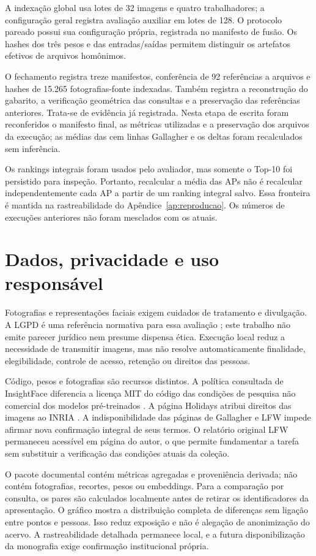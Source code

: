 A indexação global usa lotes de 32 imagens e quatro trabalhadores; a configuração geral registra avaliação auxiliar em lotes de 128. O protocolo pareado possui sua configuração própria, registrada no manifesto de fusão. Os hashes dos três pesos e das entradas/saídas permitem distinguir os artefatos efetivos de arquivos homônimos.

O fechamento registra treze manifestos, conferência de 92 referências a arquivos e hashes de 15.265 fotografias-fonte indexadas. Também registra a reconstrução do gabarito, a verificação geométrica das consultas e a preservação das referências anteriores. Trata-se de evidência já registrada. Nesta etapa de escrita foram reconferidos o manifesto final, as métricas utilizadas e a preservação dos arquivos da execução; as médias das cem linhas Gallagher e os deltas foram recalculados sem inferência.

Os rankings integrais foram usados pelo avaliador, mas somente o Top-10 foi persistido para inspeção. Portanto, recalcular a média das APs não é recalcular independentemente cada AP a partir de um ranking integral salvo. Essa fronteira é mantida na rastreabilidade do Apêndice~\ref{ap:reproducao}. Os números de execuções anteriores não foram mesclados com os atuais.

\section{Dados, privacidade e uso responsável}
Fotografias e representações faciais exigem cuidados de tratamento e divulgação. A LGPD é uma referência normativa para essa avaliação \cite{Brasil2018}; este trabalho não emite parecer jurídico nem presume dispensa ética. Execução local reduz a necessidade de transmitir imagens, mas não resolve automaticamente finalidade, elegibilidade, controle de acesso, retenção ou direitos das pessoas.

Código, pesos e fotografias são recursos distintos. A política consultada de InsightFace diferencia a licença MIT do código das condições de pesquisa não comercial dos modelos pré-treinados \cite{InsightFace}. A página Holidays atribui direitos das imagens ao INRIA \cite{Holidays}. A indisponibilidade das páginas de Gallagher e LFW impede afirmar nova confirmação integral de seus termos. O relatório original LFW permaneceu acessível em página do autor, o que permite fundamentar a tarefa sem substituir a verificação das condições atuais da coleção.

O pacote documental contém métricas agregadas e proveniência derivada; não contém fotografias, recortes, pesos ou embeddings. Para a comparação por consulta, os pares são calculados localmente antes de retirar os identificadores da apresentação. O gráfico mostra a distribuição completa de diferenças sem ligação entre pontos e pessoas. Isso reduz exposição e não é alegação de anonimização do acervo. A rastreabilidade detalhada permanece local, e a futura disponibilização da monografia exige confirmação institucional própria.

